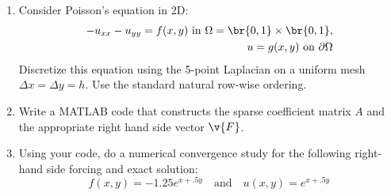 \documentclass[11pt, oneside]{article}
\begin{document}
\begin{enumerate}
    \item %
        Consider Poisson's equation in 2D:
        \begin{align*}
            -u_{xx} - u_{yy} = f(x,y)\text{ in }\Omega = \br{0,1} \times \br{0,1}, \\
            u = g(x,y)\text{ on } \partial\Omega
        \end{align*}
        Discretize this equation using the 5-point Laplacian on a uniform mesh
        $\Delta x = \Delta y = h$.
        Use the standard natural row-wise ordering.

    \item %
        Write a MATLAB code that constructs the sparse coefficient matrix $A$
        and the appropriate right hand side vector $\v{F}$.

    \item %
        Using your code, do a numerical convergence study for the following
        right-hand side forcing and exact solution:
        \[
            f(x,y) = -1.25e^{x + .5y}\quad\text{and}\quad u(x,y) = e^{x + .5y}
        \]
\end{enumerate}
\end{document}
